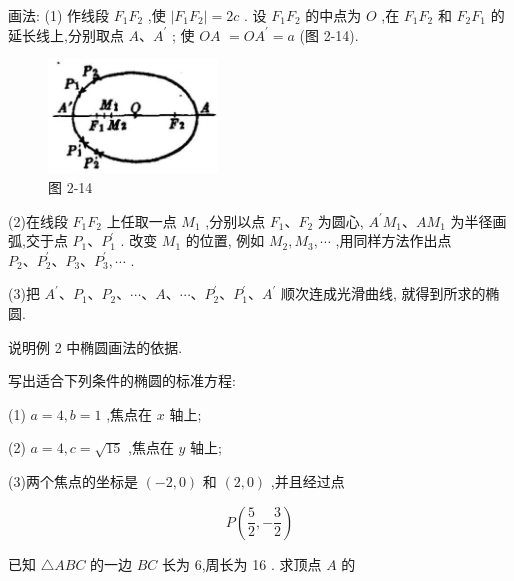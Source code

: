 \documentclass[lang=cn,newtx,10pt,scheme=chinese]{elegantbook}
\begin{document}
画法: (1) 作线段 \({F}_{1}{F}_{2}\) ,使 \(\left| {{F}_{1}{F}_{2}}\right| = {2c}\) . 设 \({F}_{1}{F}_{2}\) 的中点为 \(O\) ,在 \({F}_{1}{F}_{2}\) 和 \({F}_{2}{F}_{1}\) 的延长线上,分别取点 \(A\text{、}{A}^{\prime }\) ; 使 \({OA}\) \(= O{A}^{\prime } = a\) (图 2-14).

\begin{figure}[h]
  \centering
  \includegraphics[max width=0.4\textwidth]{images/01912cc2-ffb6-728e-9ae7-b113ff05c64b_89_799031.jpg}
  \caption{图 2-14}
\end{figure}



(2)在线段 \({F}_{1}{F}_{2}\) 上任取一点 \({M}_{1}\) ,分别以点 \({F}_{1}\text{、}{F}_{2}\) 为圆心, \({A}^{\prime }{M}_{1}\text{、}A{M}_{1}\) 为半径画弧,交于点 \({P}_{1}\text{、}{P}_{1}^{\prime }\) . 改变 \({M}_{1}\) 的位置, 例如 \({M}_{2},{M}_{3},\cdots\) ,用同样方法作出点 \({P}_{2}\text{、}{P}_{2}^{\prime }\text{、}{P}_{3}\text{、}{P}_{3}^{\prime },\cdots\) .

(3)把 \({A}^{\prime }\text{、}{P}_{1}\text{、}{P}_{2}\text{、}\cdots \text{、}A\text{、}\cdots \text{、}{P}_{2}^{\prime }\text{、}{P}_{1}^{\prime }\text{、}{A}^{\prime }\) 顺次连成光滑曲线, 就得到所求的椭圆.

\begin{problemset}[练习]

\item 说明例 2 中椭圆画法的依据.

\item 写出适合下列条件的椭圆的标准方程:

(1) \(a = 4,b = 1\) ,焦点在 \(x\) 轴上;

(2) \(a = 4,c = \sqrt{15}\) ,焦点在 \(y\) 轴上;

(3)两个焦点的坐标是 \(\left( {-2,0}\right)\) 和 \(\left( {2,0}\right)\) ,并且经过点

\[
  P\left( {\frac{5}{2}, - \frac{3}{2}}\right)
\]

\item 已知 \(\bigtriangleup {ABC}\) 的一边 \({BC}\) 长为 6,周长为 16 . 求顶点 \(A\) 的

\end{problemset}
\end{document}
